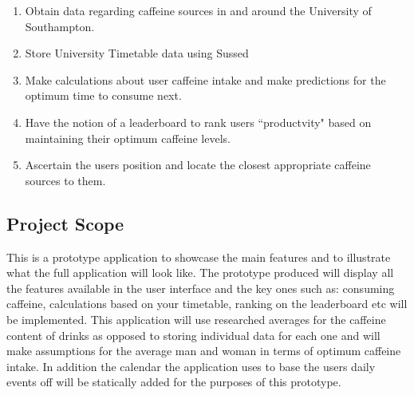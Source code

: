 \begin{enumerate}
	\item{Obtain data regarding caffeine sources in and around the University of Southampton.}
	\item{Store University Timetable data using Sussed}
	\item{Make calculations about user caffeine intake and make predictions for the optimum time to consume next.}
	\item{Have the notion of a leaderboard to rank users ``productvity" based on maintaining their optimum caffeine levels.}
	\item{Ascertain the users position and locate the closest appropriate caffeine sources to them.}
\end{enumerate}

\subsection{Project Scope}
This is a prototype application to showcase the main features and to illustrate what the full application will look like. The prototype produced will display all the features available in the user interface and the key ones such as: consuming caffeine, calculations based on your timetable, ranking on the leaderboard etc will be implemented. This application will use researched averages for the caffeine content of drinks as opposed to storing individual data for each one and will make assumptions for the average man and woman in terms of optimum caffeine intake. In addition the calendar the application uses to base the users daily events off will be statically added for the purposes of this prototype. 

